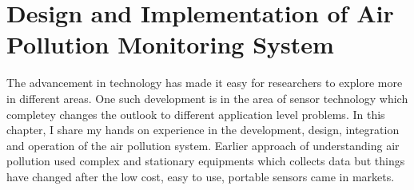 \documentclass[11pt]{article}
\begin{document}
\section*{Design and Implementation of Air Pollution Monitoring System}

The advancement in technology has made it easy for researchers to explore more in different areas. One such development is in the area of sensor technology which completey changes the outlook to different application level problems. In this chapter, I share my hands on experience in the development, design, integration and operation of the air pollution system. Earlier approach of understanding air pollution used complex and stationary equipments which collects data but things have changed after the low cost, easy to use, portable sensors came in markets. 
\end{document}
